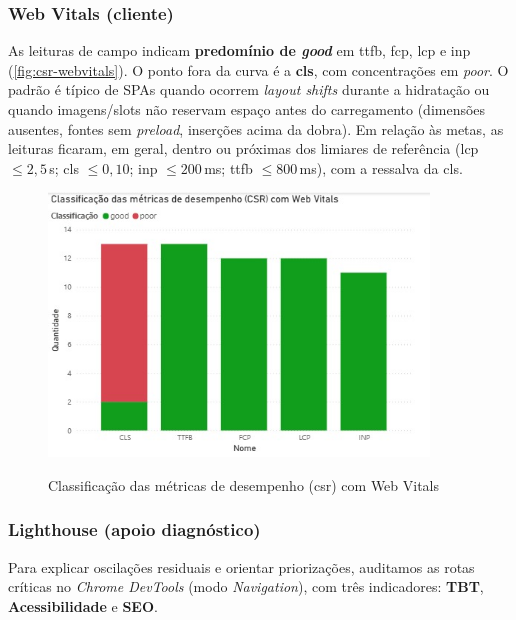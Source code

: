 \subsubsection*{Web Vitals (cliente)}
As leituras de campo indicam \textbf{predomínio de \textit{good}} em \acrshort{ttfb}, \acrshort{fcp}, \acrshort{lcp} e \acrshort{inp} (\autoref{fig:csr-webvitals}). O ponto fora da curva é a \textbf{\acrshort{cls}}, com concentrações em \textit{poor}. O padrão é típico de SPAs quando ocorrem \emph{layout shifts} durante a hidratação ou quando imagens/slots não reservam espaço antes do carregamento (dimensões ausentes, fontes sem \emph{preload}, inserções acima da dobra). Em relação às metas, as leituras ficaram, em geral, dentro ou próximas dos limiares de referência (\acrshort{lcp} $\leq 2{,}5$\,s; \acrshort{cls} $\leq 0{,}10$; \acrshort{inp} $\leq 200$\,ms; \acrshort{ttfb} $\leq 800$\,ms), com a ressalva da \acrshort{cls}.

\begin{figure}[H]
\centering
\caption{Classificação das métricas de desempenho (\acrshort{csr}) com Web Vitals}
\includegraphics[width=0.9\textwidth]{media/metricas_csr_web_vitals.jpeg}
\label{fig:csr-webvitals}
\end{figure}

\subsubsection*{Lighthouse (apoio diagnóstico)}
Para explicar oscilações residuais e orientar priorizações, auditamos as rotas críticas no \emph{Chrome DevTools} (modo \emph{Navigation}), com três indicadores: \textbf{TBT}, \textbf{Acessibilidade} e \textbf{SEO}.

